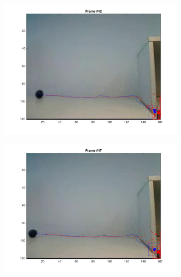 \documentclass{ethz_report}
\begin{document}
\begin{figure}[h]
\begin{subfigure}[b]{.25\textwidth}
        \includegraphics[width=1\linewidth]{images/video3_observe_high_41}
    \end{subfigure}%
    \begin{subfigure}[b]{.25\textwidth}
        \centering
        \includegraphics[width=1\linewidth]{images/video3_observe_high_46}
    \end{subfigure}%
    \begin{subfigure}[b]{.25\textwidth}
        \centering

\end{subfigure}
\end{figure}
\end{document}
